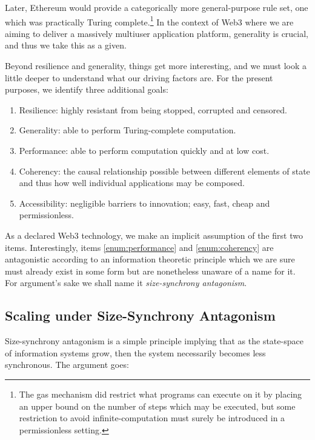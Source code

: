 Later, Ethereum would provide a categorically more general-purpose rule set, one which was practically Turing complete.\footnote{The gas mechanism did restrict what programs can execute on it by placing an upper bound on the number of steps which may be executed, but some restriction to avoid infinite-computation must surely be introduced in a permissionless setting.} In the context of Web3 where we are aiming to deliver a massively multiuser application platform, generality is crucial, and thus we take this as a given.

Beyond resilience and generality, things get more interesting, and we must look a little deeper to understand what our driving factors are. For the present purposes, we identify three additional goals:
\begin{enumerate}
  \item \label{enum:resilience} Resilience: highly resistant from being stopped, corrupted and censored.
  \item \label{enum:generality} Generality: able to perform Turing-complete computation.
  \item \label{enum:performance} Performance: able to perform computation quickly and at low cost.
  \item \label{enum:coherency} Coherency: the causal relationship possible between different elements of state and thus how well individual applications may be composed.
  \item \label{enum:accessibility} Accessibility: negligible barriers to innovation; easy, fast, cheap and permissionless.
\end{enumerate}

As a declared Web3 technology, we make an implicit assumption of the first two items. Interestingly, items \ref{enum:performance} and \ref{enum:coherency} are antagonistic according to an information theoretic principle which we are sure must already exist in some form but are nonetheless unaware of a name for it. For argument's sake we shall name it \emph{size-synchrony antagonism}.

\subsection{Scaling under Size-Synchrony Antagonism}

Size-synchrony antagonism is a simple principle implying that as the state-space of information systems grow, then the system necessarily becomes less synchronous. The argument goes:

